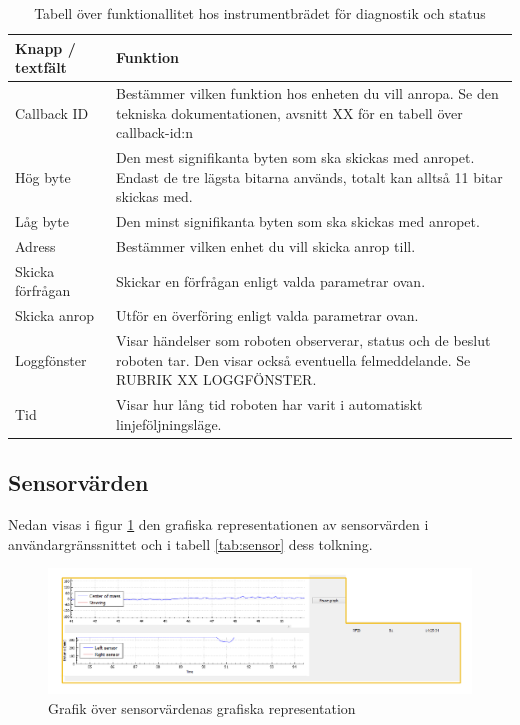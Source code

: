 \documentclass[a4paper,12pt]{article}
\begin{document}
\begin{table}[H]
    \centering
    \begin{tabularx}{\textwidth}{|l|X|}
        \hline \textbf{Knapp / textfält} & \textbf{Funktion} \\ \hline
        Callback ID & Bestämmer vilken funktion hos enheten du vill anropa. Se den tekniska dokumentationen, avsnitt XX för en tabell över callback-id:n \\ \hline
        Hög byte & Den mest signifikanta byten som ska skickas med anropet. Endast de tre lägsta bitarna används, totalt kan alltså 11 bitar skickas med. \\ \hline
        Låg byte & Den minst signifikanta byten som ska skickas med anropet. \\ \hline
        Adress & Bestämmer vilken enhet du vill skicka anrop till. \\ \hline
        Skicka förfrågan & Skickar en förfrågan enligt valda parametrar ovan. \\ \hline
        Skicka anrop & Utför en överföring enligt valda parametrar ovan. \\ \hline
        Loggfönster & Visar händelser som roboten observerar, status och de beslut roboten tar. Den visar också eventuella felmeddelande. Se RUBRIK XX LOGGFÖNSTER.\\ \hline
        Tid & Visar hur lång tid roboten har varit i automatiskt linjeföljningsläge. \\ \hline
    \end{tabularx}
\caption{Tabell över funktionallitet hos instrumentbrädet för diagnostik och status}
\label{tab:diag}
\end{table}

\subsection{Sensorvärden}
\label{subsec:sensor}
Nedan visas i figur \ref{fig:pc_sensor} den grafiska representationen av sensorvärden i användargränssnittet och  i tabell \ref{tab:sensor} dess tolkning.

\begin{figure}[H]
	\centering
	\includegraphics[width=1.0\textwidth]{sensor.pdf}
	\caption{Grafik över sensorvärdenas grafiska representation}
	\label{fig:pc_sensor}
\end{figure}
\end{document}

